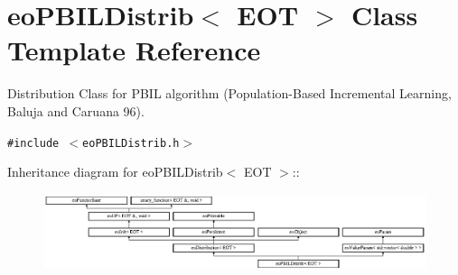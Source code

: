\section{eo\-PBILDistrib$<$ EOT $>$ Class Template Reference}
\label{classeo_p_b_i_l_distrib}
Distribution Class for PBIL algorithm (Population-Based Incremental Learning, Baluja and Caruana 96).  


{\tt \#include $<$eo\-PBILDistrib.h$>$}

Inheritance diagram for eo\-PBILDistrib$<$ EOT $>$::\begin{figure}[H]
\begin{center}
\leavevmode
\includegraphics[height=2.26721cm]{classeo_p_b_i_l_distrib}
\end{center}
\end{figure}
